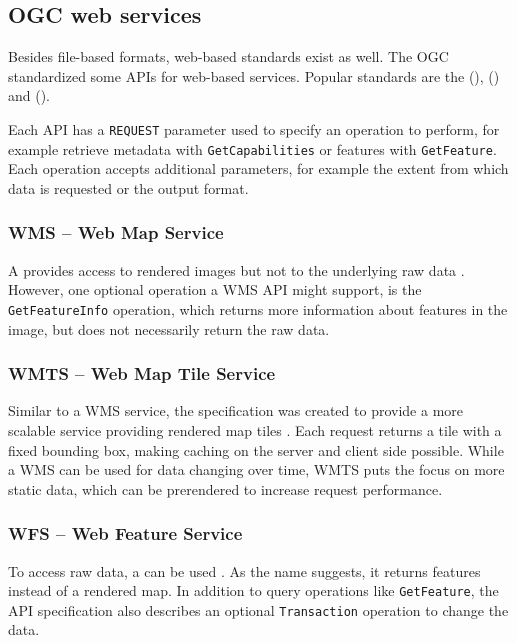 	\subsection{OGC web services}
	
		Besides file-based formats, web-based standards exist as well.
		The OGC standardized some APIs for web-based services.
		Popular standards are the  (),  () and  ().
		
		Each API has a \texttt{REQUEST} parameter used to specify an operation to perform, for example retrieve metadata with \texttt{GetCapabilities} or features with \texttt{GetFeature}.
		Each operation accepts additional parameters, for example the extent from which data is requested or the output format.
		
		\subsubsection{WMS -- Web Map Service}
		
			A  provides access to rendered images but not to the underlying raw data \cite{ogc-wms}.
			However, one optional operation a WMS API might support, is the \texttt{GetFeatureInfo} operation, which returns more information about features in the image, but does not necessarily return the raw data.
		
		\subsubsection{WMTS -- Web Map Tile Service}
		
			Similar to a WMS service, the  specification was created to provide a more scalable service providing rendered map tiles \cite{ogc-wmts}.
			Each request returns a tile with a fixed bounding box, making caching on the server and client side possible.
			While a WMS can be used for data changing over time, WMTS puts the focus on more static data, which can be prerendered to increase request performance.
		
		\subsubsection{WFS -- Web Feature Service}
		
			To access raw data, a  can be used \cite{ogc-wfs}.
			As the name suggests, it returns features instead of a rendered map.
			In addition to query operations like \texttt{GetFeature}, the API specification also describes an optional \texttt{Transaction} operation to change the data.
	
